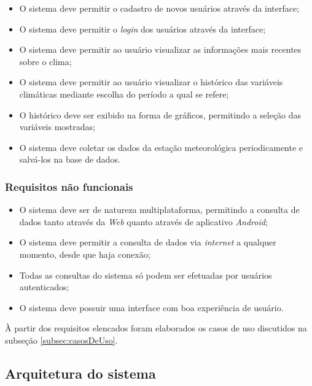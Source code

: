 \begin{itemize}
    \item O sistema deve permitir o cadastro de novos usuários através da interface;
    
    \item O sistema deve permitir o \textit{login} dos usuários através da interface;

    \item O sistema deve permitir ao usuário visualizar as informações mais recentes sobre o clima;

    \item O sistema deve permitir ao usuário visualizar o histórico das variáveis climáticas mediante escolha do período a qual se refere;

	\item O histórico deve ser exibido na forma de gráficos, permitindo a seleção das variáveis mostradas;
	
	\item O sistema deve coletar os dados da estação meteorológica periodicamente e salvá-los na base de dados.
\end{itemize}

\subsubsection{Requisitos não funcionais}

\begin{itemize}
    \item O sistema deve ser de natureza multiplataforma, permitindo a consulta de dados tanto através da \textit{Web} quanto através de aplicativo \textit{Android};
    
    \item O sistema deve permitir a consulta de dados via \textit{internet} a qualquer momento, desde que haja conexão;

    \item Todas as consultas do sistema só podem ser efetuadas por usuários autenticados;

    \item O sistema deve possuir uma interface com boa experiência de usuário.

\end{itemize}

À partir dos requisitos elencados foram elaborados os casos de uso discutidos na subseção \ref{subsec:casosDeUso}.

\subsection{Arquitetura do sistema}

